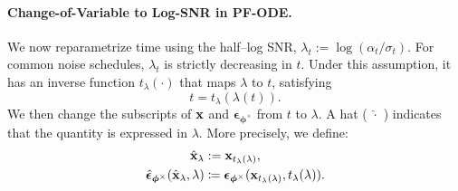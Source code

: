 \paragraph{Change-of-Variable to Log-SNR in PF-ODE.} We now reparametrize time using the half–log SNR, $\lambda_t := \log(\alpha_t/\sigma_t)$. 
For common noise schedules, $\lambda_t$ is strictly decreasing in $t$. Under this assumption, it has an inverse function $t_\lambda(\cdot)$ that maps $\lambda$ to $t$, satisfying  
\[
t = t_\lambda(\lambda(t)).
\]  
We then change the subscripts of ${\mathbf{x}}$ and $\bm{\epsilon}_{\bm{\phi}^\times}$ from $t$ to $\lambda$. A hat (  $\hat{\cdot}$  ) indicates that the quantity is expressed in $\lambda$. More precisely, we define:
\begin{align}
\begin{aligned}
    \label{eq:change-of-var-x-epsilon}
 \hat{{\mathbf{x}}}_{\lambda} & := {\mathbf{x}}_{t_\lambda(\lambda)}, \\
 \hat{\bm{\epsilon}}_{\bm{\phi}^\times}(\hat{{\mathbf{x}}}_{\lambda}, \lambda) & \coloneqq \bm{\epsilon}_{\bm{\phi}^\times}({\mathbf{x}}_{t_\lambda(\lambda)}, t_\lambda(\lambda)).
\end{aligned}
\end{align}


